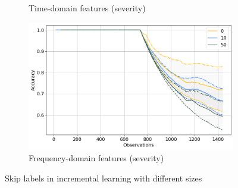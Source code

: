 \begin{figure}[h]
\begin{subfigure}[b]{0.48\textwidth}
        \caption{Time-domain features (severity)}
    \end{subfigure}
    \hfill
    \begin{subfigure}[b]{0.48\textwidth}
        \includegraphics[width=\textwidth]{assets/results/incremental-learning/skip-label-FD-severity.png}
        \caption{Frequency-domain features (severity)}
    \end{subfigure} 
    \caption{Skip labels in incremental learning with different sizes}
\end{figure}




